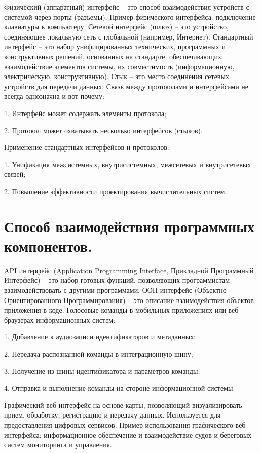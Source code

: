 \documentclass[14pt]{extarticle} %
\begin{document}
Физический (аппаратный) интерфейс – это способ взаимодействия устройств с системой через порты (разъемы). Пример физического интерфейса: подключение клавиатуры к компьютеру.
Сетевой интерфейс (шлюз) – это устройство, соединяющее локальную сеть с глобальной (например, Интернет).
Стандартный интерфейс – это набор унифицированных технических, программных и конструктивных решений, основанных на стандарте, обеспечивающих взаимодействие элементов системы, их совместимость (информационную, электрическую, конструктивную).
Стык – это место соединения сетевых устройств для передачи данных. Связь между протоколами и интерфейсами не всегда однозначна и вот почему:

1.	Интерфейс может содержать элементы протокола;

2.	Протокол может охватывать несколько интерфейсов (стыков).

Применение стандартных интерфейсов и протоколов:

1.	Унификация межсистемных, внутрисистемных, межсетевых и внутрисетевых связей;

2.	Повышение эффективности проектирования вычислительных систем.


\section{Способ взаимодействия программных компонентов.} \label{sec:seven}
API интерфейс (Application Programming Interface, Прикладной Программный Интерфейс) – это набор готовых функций, позволяющих программистам взаимодействовать с другими программами.
ООП-интерфейс (Объектно-Ориентированного Программирования) – это описание взаимодействия объектов приложения в коде.
Голосовые команды в мобильных приложениях или веб-браузерах информационных систем:

1.	Добавление к аудиозаписи идентификаторов и метаданных;

2.	Передача распознанной команды в интеграционную шину;

3.	Получение из шины идентификатора и параметров команды;

4.	Отправка и выполнение команды на стороне информационной системы.

Графический веб-интерфейс на основе карты, позволяющий визуализировать прием, обработку, регистрацию и передачу данных. Используется для предоставления цифровых сервисов. Пример использования графического веб-интерфейса: информационное обеспечение и взаимодействие судов и береговых систем мониторинга и управления.
\end{document}
